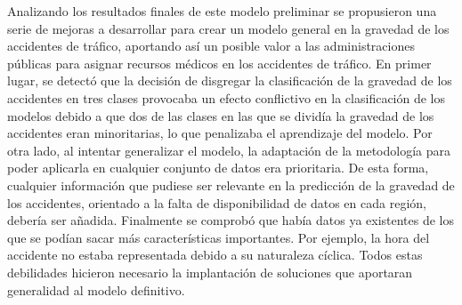 Analizando los resultados finales de este modelo preliminar se propusieron una serie de mejoras a desarrollar para crear un modelo general en la gravedad de los accidentes de tráfico, aportando así un posible valor a las administraciones públicas para asignar recursos médicos en los accidentes de tráfico. En primer lugar, se detectó que la decisión de disgregar la clasificación de la gravedad de los accidentes en tres clases provocaba un efecto conflictivo en la clasificación de los modelos debido a que dos de las clases en las que se dividía la gravedad de los accidentes eran minoritarias, lo que penalizaba el aprendizaje del modelo. Por otra lado, al intentar generalizar el modelo, la adaptación de la metodología para poder aplicarla en cualquier conjunto de datos era prioritaria. De esta forma, cualquier información que pudiese ser relevante en la predicción de la gravedad de los accidentes, orientado a la falta de disponibilidad de datos en cada región, debería ser añadida. Finalmente se comprobó que había datos ya existentes de los que se podían sacar más características importantes. Por ejemplo, la hora del accidente no estaba representada debido a su naturaleza cíclica. Todos estas debilidades hicieron necesario la implantación de soluciones que aportaran generalidad al modelo definitivo.



